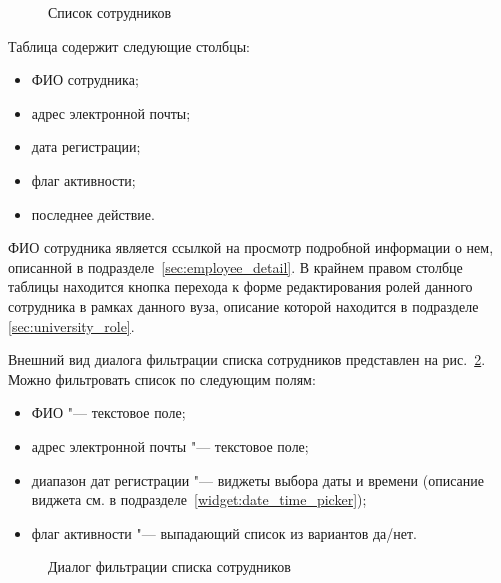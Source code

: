 \begin{figure}[H]
	\caption{Список сотрудников}
	\label{img:employee:employee_list}
\end{figure}


Таблица содержит следующие столбцы:
\begin{itemize}
	\item ФИО сотрудника;
	\item адрес электронной почты;
	\item дата регистрации;
	\item флаг активности;
	\item последнее действие.
\end{itemize}

ФИО сотрудника является ссылкой на просмотр подробной информации о нем, описанной в подразделе~\ref{sec:employee_detail}.
В крайнем правом столбце таблицы находится кнопка перехода к форме редактирования ролей данного сотрудника в рамках данного вуза, 
описание которой находится в подразделе \ref{sec:university_role}.


Внешний вид диалога фильтрации списка сотрудников представлен на рис.~\ref{img:employee:employee_list_filter}.
Можно фильтровать список по следующим полям:

\begin{itemize}
	\item ФИО "--- текстовое поле;
	\item адрес электронной почты "--- текстовое поле;
	\item диапазон дат регистрации "--- виджеты выбора даты и времени 
	(описание виджета см. в подразделе~\ref{widget:date_time_picker});
	\item флаг активности "--- выпадающий список из вариантов да/нет.
\end{itemize}

\begin{figure}[H]
	\caption{Диалог фильтрации списка сотрудников}
	\label{img:employee:employee_list_filter}
\end{figure}


